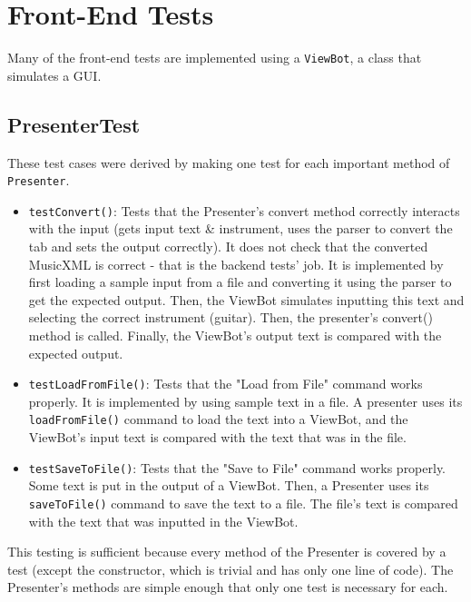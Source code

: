 \documentclass[11pt]{article}
\date{\today}
\title{}
\begin{document}
\tableofcontents

\section{Front-End Tests}
\label{sec:orgeef44c7}
Many of the front-end tests are implemented using a \texttt{ViewBot}, a class that simulates a GUI.

\subsection{PresenterTest}
\label{sec:orga745a2c}
These test cases were derived by making one test for each important method of \texttt{Presenter}.
\begin{itemize}
\item \texttt{testConvert()}: Tests that the Presenter's convert method correctly interacts with the input (gets input text \& instrument, uses the parser to convert the tab and sets the output correctly).  It does not check that the converted MusicXML is correct - that is the backend tests' job.  
It is implemented by first loading a sample input from a file and converting it using the parser to get the expected output.  Then, the ViewBot simulates inputting this text and selecting the correct instrument (guitar).  Then, the presenter's convert() method is called.  Finally, the ViewBot's output text is compared with the expected output.
\item \texttt{testLoadFromFile()}: Tests that the "Load from File" command works properly.  
It is implemented by using sample text in a file.  A presenter uses its \texttt{loadFromFile()} command to load the text into a ViewBot, and the ViewBot's input text is compared with the text that was in the file.
\item \texttt{testSaveToFile()}: Tests that the "Save to File" command works properly.
Some text is put in the output of a ViewBot.  Then, a Presenter uses its \texttt{saveToFile()} command to save the text to a file.  The file's text is compared with the text that was inputted in the ViewBot.
\end{itemize}

This testing is sufficient because every method of the Presenter is covered by a test (except the constructor, which is trivial and has only one line of code).  The Presenter's methods are simple enough that only one test is necessary for each.
\end{document}

